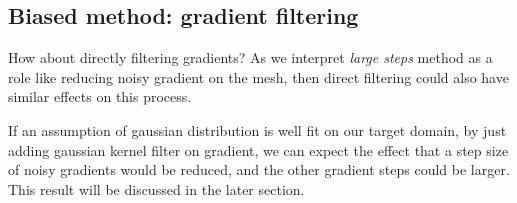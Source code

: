 \subsection*{Biased method: gradient filtering}

How about directly filtering gradients? As we interpret \emph{large steps} method as a role like reducing noisy gradient on the mesh, then direct filtering could also have similar effects on this process.

If an assumption of gaussian distribution is well fit on our target domain, by just adding gaussian kernel filter on gradient, we can expect the effect that a step size of noisy gradients would be reduced, and the other gradient steps could be larger. This result will be discussed in the later section.